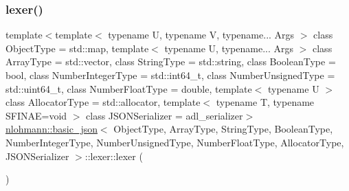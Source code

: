 \subsubsection{\texorpdfstring{lexer()}{lexer()}\hspace{0.1cm}{\footnotesize\ttfamily [3/4]}}
{\footnotesize\ttfamily template$<$template$<$ typename U, typename V, typename... Args $>$ class Object\+Type = std\+::map, template$<$ typename U, typename... Args $>$ class Array\+Type = std\+::vector, class String\+Type  = std\+::string, class Boolean\+Type  = bool, class Number\+Integer\+Type  = std\+::int64\+\_\+t, class Number\+Unsigned\+Type  = std\+::uint64\+\_\+t, class Number\+Float\+Type  = double, template$<$ typename U $>$ class Allocator\+Type = std\+::allocator, template$<$ typename T, typename S\+F\+I\+N\+A\+E=void $>$ class J\+S\+O\+N\+Serializer = adl\+\_\+serializer$>$ \\
\hyperlink{classnlohmann_1_1basic__json}{nlohmann\+::basic\+\_\+json}$<$ Object\+Type, Array\+Type, String\+Type, Boolean\+Type, Number\+Integer\+Type, Number\+Unsigned\+Type, Number\+Float\+Type, Allocator\+Type, J\+S\+O\+N\+Serializer $>$\+::lexer\+::lexer (\begin{DoxyParamCaption}{ }\end{DoxyParamCaption})\hspace{0.3cm}{\ttfamily [delete]}}

\mbox{\label{classnlohmann_1_1basic__json_1_1lexer_a771415d8d7ef845c1969fa67b67877c2}} 
